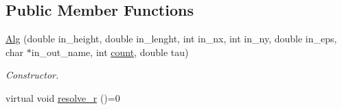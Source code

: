\subsection*{Public Member Functions}
\begin{DoxyCompactItemize}
\item 
\hyperlink{classAlg_a6c9a358be9a0b2cd2e35cf8a1ef6b60d}{Alg} (double in\_\-height, double in\_\-lenght, int in\_\-nx, int in\_\-ny, double in\_\-eps, char $\ast$in\_\-out\_\-name, int \hyperlink{classAlg_a919db7af2565185ba66adc8c0ae54686}{count}, double tau)
\begin{DoxyCompactList}\small\item\em Constructor. \end{DoxyCompactList}\item 
\hypertarget{classAlg_a21abd0bdf75af1e61e2c4dd00a5163f6}{
virtual void \hyperlink{classAlg_a21abd0bdf75af1e61e2c4dd00a5163f6}{resolve\_\-r} ()=0}
\label{classAlg_a21abd0bdf75af1e61e2c4dd00a5163f6}


\end{DoxyCompactItemize}
